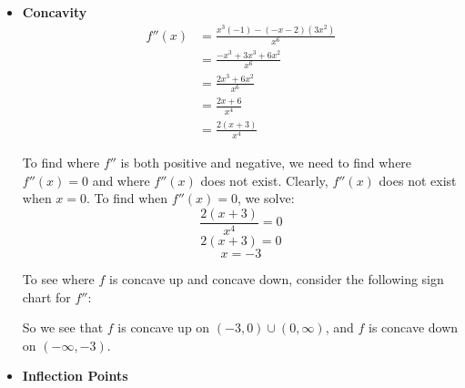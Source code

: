 \documentclass[handout, nooutcomes]{ximera}
\newcommand{\dfn}{\textbf}
\renewenvironment{freeResponse}{
\ifhandout\setbox0\vbox\bgroup\else
\begin{trivlist}\item[\hskip \labelsep\bfseries Solution:\hspace{2ex}]
\fi}
{\ifhandout\egroup\else
\end{trivlist}
\fi}
\begin{document}
\begin{problem}
\begin{freeResponse}
\begin{itemize}
			
			
			\item  \dfn{Concavity}
			\begin{align*}
			f''(x) &= \frac{x^3(-1) - (-x-2)(3x^2)}{x^6} \\
			&= \frac{-x^3 + 3x^3 + 6x^2}{x^6} \\
			&= \frac{2x^3 + 6x^2}{x^6} \\
			&= \frac{2x+6}{x^4} \\
			&= \frac{2(x+3)}{x^4}
			\end{align*}
			
			To find where $f''$ is both positive and negative, we need to find where $f''(x) = 0$ and where $f''(x)$ does not exist.  Clearly, $f''(x)$ does not exist when $x=0$.  To find when $f''(x) = 0$, we solve:
			$$ \frac{2(x+3)}{x^4} = 0 $$
			$$ 2(x+3) = 0 $$
			$$ x=-3 $$
			
			To see where $f$ is concave up and concave down, consider the following sign chart for $f''$:
			
		
\begin{center}
\begin{image}
\end{image}
\end{center}


			So we see that $f$ is concave up on $(-3,0) \cup (0,\infty)$, and $f$ is concave down on $(-\infty, -3)$.

			
			
			
			\item  \dfn{Inflection Points}  \\
			

\end{itemize}
\end{freeResponse}
\end{problem}
\end{document}
